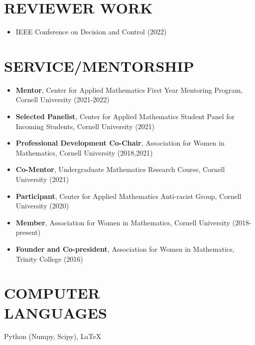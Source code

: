 \documentclass{res} %
\begin{document}
\begin{resume}
\section{REVIEWER WORK}
\begin{itemize}
	\item IEEE Conference on Decision and Control (2022)
\end{itemize}

\section{SERVICE/MENTORSHIP}
\begin{itemize}
	\item \textbf{Mentor}, Center for Applied Mathematics First Year Mentoring Program, Cornell University (2021-2022)
        \item \textbf{Selected Panelist}, Center for Applied Mathematics Student Panel for Incoming Students, Cornell University (2021)
	\item \textbf{Professional Development Co-Chair}, Association for Women in Mathematics, Cornell University (2018,2021)
	\item \textbf{Co-Mentor}, Undergraduate Mathematics Research Course, Cornell University (2021)
        \item \textbf{Participant}, Center for Applied Mathematics Anti-racist Group, Cornell University (2020)
	\item \textbf{Member}, Association for Women in Mathematics, Cornell University (2018-present)
        \item \textbf{Founder and Co-president}, Association for Women in Mathematics, Trinity College (2016)
\end{itemize}



\section{COMPUTER \\ LANGUAGES}
Python (Numpy, Scipy), \LaTeX

\end{resume}
\end{document}
